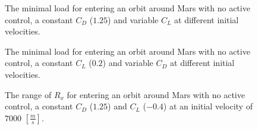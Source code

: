 \documentclass[12pt]{article}
\newlength\figureheight
\newlength\figurewidth
\begin{document}
\thispagestyle{empty}
\begin{figure}
	\centering
	\setlength\figureheight{5cm} 
	\setlength\figurewidth{13cm}
	
	\caption*{The minimal load for entering an orbit around Mars with no active control, a constant $C_D$ ($1.25$) and variable $C_L$ at different initial velocities.}
\end{figure}

\begin{figure}
	\centering
	\setlength\figureheight{5cm} 
	\setlength\figurewidth{12.5cm}
	
	\caption*{The minimal load for entering an orbit around Mars with no active control, a constant $C_L$ ($0.2$) and variable $C_D$ at different initial velocities.}
\end{figure}

\begin{figure}
	\centering
	\setlength\figureheight{5cm} 
	\setlength\figurewidth{10cm}
	
	\caption*{The range of $R_x$ for entering an orbit around Mars with no active control, a constant $C_D$ ($1.25$) and $C_L$ ($-0.4$) at an initial velocity of $7000$ $\left[\frac{m}{s}\right]$.}
\end{figure}
\end{document}
